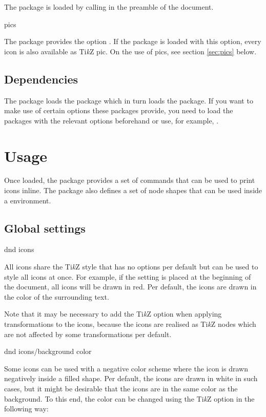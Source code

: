 \documentclass[a4paper]{article}
\begin{document}
The  package is loaded by calling \macro{\usepackage{dndicons}} in the preamble of the document. 

\begin{macrodef}pics\end{macrodef}
The package provides the option . If the package is loaded with this option, every icon is also available as Ti\emph{k}Z pic. On the use of pics, see section \ref{sec:pics} below.

\subsection{Dependencies}

The package loads the  package which in turn loads the  package. If you want to make use of certain options these packages provide, you need to load the packages with the relevant options beforehand or use, for example, .

\section{Usage}

Once loaded, the package provides a set of commands that can be used to print icons inline. The package also defines a set of node shapes that can be used inside a  environment. 

\subsection{Global settings}

\begin{macrodef}dnd icons\end{macrodef}
All icons share the Ti\emph{k}Z style  that has no options per default but can be used to style all icons at once. For example, if the setting  is placed at the beginning of the document, all icons will be drawn in red. Per default, the icons are drawn in the color of the surrounding text. 

Note that it may be necessary to add the Ti\emph{k}Z option  when applying transformations to the icons, because the icons are realised as Ti\emph{k}Z nodes which are not affected by some transformations per default.

\begin{macrodef}dnd icons/background color\end{macrodef}
Some icons can be used with a negative color scheme where the icon is drawn negatively inside a filled shape. Per default, the icons are drawn in white in such cases, but it might be desirable that the icons are in the same color as the background. To this end, the color can be changed using the Ti\emph{k}Z option  in the following way:
\end{document}
